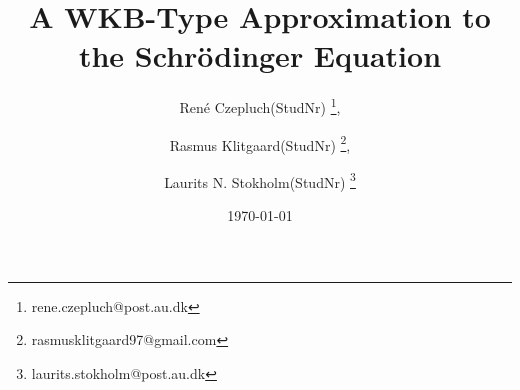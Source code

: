 \documentclass[danish, a4paper, onecolumn, oneside]{article}
\title{A WKB-Type Approximation to the Schrödinger Equation}
\author{%
        René Czepluch(StudNr)       \thanks{rene.czepluch@post.au.dk},
   \and Rasmus Klitgaard(StudNr)    \thanks{rasmusklitgaard97@gmail.com},
   \and Laurits N. Stokholm(StudNr) \thanks{laurits.stokholm@post.au.dk}

   }
\date{\today}
\begin{document}
\begin{titlingpage}
\maketitle
\end{titlingpage}
\noindent







\end{document}
